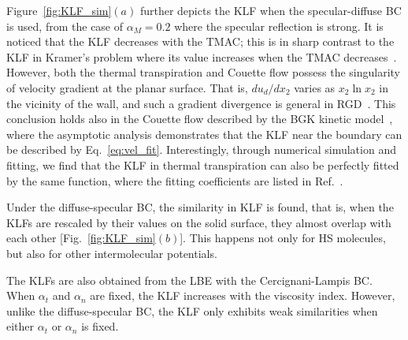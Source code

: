 Figure~\ref{fig:KLF_sim}$(a)$ further depicts the KLF when the specular-diffuse BC is used, from the case of $\alpha_M=0.2$  where the specular reflection is strong. It is noticed that the KLF decreases with the TMAC; this is in sharp contrast to the KLF in Kramer's problem where its value increases when the TMAC decreases~\citep{SU2019573}. However, both the thermal transpiration and Couette flow possess the singularity of velocity gradient at the planar surface. That is, $du_d/dx_2$ varies as $x_2\ln{}x_2$ in the vicinity of the wall, and such a gradient divergence is general in RGD~\citep{takata2013singular}. This conclusion holds also in the Couette flow described by the BGK kinetic model~\citep{Jiang2016JCP}, where the asymptotic analysis demonstrates that the KLF near the boundary can be described by Eq.~\eqref{eq:vel_fit}.
Interestingly, through numerical simulation and fitting, we find that the KLF in thermal transpiration can also be perfectly fitted by the same function,  where the fitting coefficients are listed in  Ref.~\cite{Wang2020PoF}.


Under the diffuse-specular BC, the similarity in KLF is found, that is, when the KLFs are rescaled by their values on the solid surface, they almost overlap with each other [Fig.~\ref{fig:KLF_sim}$(b)$]. This happens not only for HS molecules, but also for other intermolecular potentials. 




The KLFs are also obtained from the LBE with the Cercignani-Lampis BC. When $\alpha_t$ and $\alpha_n$ are fixed, the KLF increases with the viscosity index. However, unlike the diffuse-specular BC, the KLF only exhibits weak similarities when either $\alpha_t$ or $\alpha_n$ is fixed.


